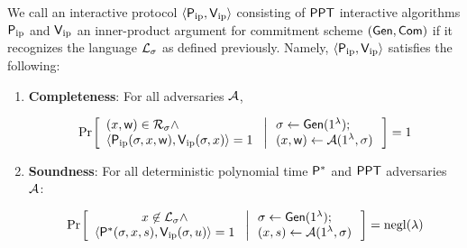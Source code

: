 \begin{definition}\label{defn:innerproductarg} 
We call an interactive protocol $\langle \mathsf{P}_\mathrm{ip},\mathsf{V}_\mathrm{ip}\rangle$ consisting of $\mathsf{PPT}$ interactive algorithms $\mathsf{P}_\mathrm{ip}$ and $\mathsf{V}_\mathrm{ip}$ an inner-product argument for commitment scheme $(\mathsf{Gen},\mathsf{Com})$ if it recognizes the language $\mathcal{L}_\sigma$ as defined previously. Namely, $\langle \mathsf{P}_\mathrm{ip},\mathsf{V}_\mathrm{ip}\rangle$ satisfies the following:
\begin{enumerate}[{\rm (i)}]
\item {\bf Completeness}: For all adversaries $\mathcal{A}$,

\footnotesize
\begin{align*}
\condprob{
	\begin{array}{l}
	(\stmt,\wit)\in \calR_\sigma \wedge \\ \langle \pip(\sigma,\stmt,\wit),\vip(\sigma,\stmt)\rangle=1
	\end{array}}{
	\begin{array}{l}
	\sigma\gets \gen(\secparam);\\
	(\stmt,\wit)\gets \adv(\secparam,\sigma)
	\end{array}
}
=1
\end{align*}
\normalsize

\item{\bf Soundness}: For all deterministic polynomial time $\mathsf{P}^*$ and $\mathsf{PPT}$ adversaries $\mathcal{A}$:

\footnotesize
\begin{align*}
\condprob{
	\begin{array}{c}
	\stmt\not\in \calL_\sigma \wedge \\
	\langle
\prover^*(\sigma,\stmt,s),\vip(\sigma,u)\rangle=1
\end{array}}{
\begin{array}{l}
\sigma\gets \gen(\secparam);\\
(\stmt,s)\gets \adv(\secparam,\sigma)
\end{array}
} = \negl(\lambda)
\end{align*}

\end{enumerate}

\end{definition}

